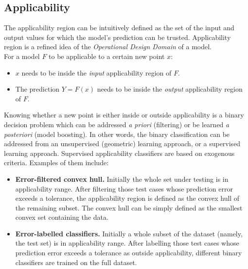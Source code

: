 \subsection{Applicability}
\indent The applicability region can be intuitively defined as the set of the input and output values for which the model's prediction can be trusted. Applicability region is a refined idea of the \textit{Operational Design Domain} of a model.\\
\indent For a model $F$ to be applicable to a certain new point $x$:
\begin{itemize}
	\item $x$ needs to be inside the \textit{input} applicability region of $F$.
	\item The prediction $Y=F(x)$ needs to be inside the \textit{output} applicability region of $F$.
\end{itemize}

\indent Knowing whether a new point is either inside or outside applicability is a binary decision problem which can be addressed \textit{a priori} (filtering) or be learned \textit{a posteriori} (model boosting). In other words, the binary classification can be addressed from an unsupervised (geometric) learning approach, or a supervised learning approach. Supervised applicability classifiers are based on exogenous criteria. Examples of them include:
\begin{itemize}
	\item \textbf{Error-filtered convex hull.} Initially the whole set under testing is in applicability range. After filtering those test cases whose prediction error exceeds a tolerance, the applicability region is defined as the convex hull of the remaining subset. The convex hull can be simply defined as the smallest convex set containing the data\cite{Preparata1985}.
	\item \textbf{Error-labelled classifiers.} Initially a whole subset of the dataset (namely, the test set) is in applicability range. After labelling those test cases whose prediction error exceeds a tolerance as outside applicability, different binary classifiers are trained on the full dataset.\\
\end{itemize}

